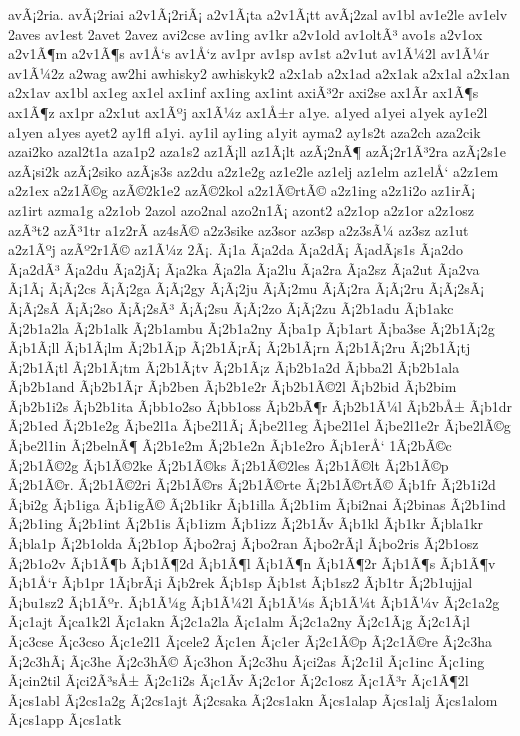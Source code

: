 {avÃ¡2ria.
avÃ¡2riai
a2v1Ã¡2riÃ¡
a2v1Ã¡ta
a2v1Ã¡tt
avÃ¡2zal
av1bl
av1e2le
av1elv
2aves
av1est
2avet
2avez
avi2cse
av1ing
av1kr
a2v1old
av1oltÃ³
avo1s
a2v1ox
a2v1Ã¶m
a2v1Ã¶s
av1Å‘s
av1Å‘z
av1pr
av1sp
av1st
a2v1ut
av1Ã¼2l
av1Ã¼r
av1Ã¼2z
a2wag
aw2hi
awhisky2
awhiskyk2
a2x1ab
a2x1ad
a2x1ak
a2x1al
a2x1an
a2x1av
ax1bl
ax1eg
ax1el
ax1inf
ax1ing
ax1int
axiÃ³2r
axi2se
ax1Ã­r
ax1Ã¶s
ax1Ã¶z
ax1pr
a2x1ut
ax1Ãºj
ax1Ã¼z
ax1Å±r
a1ye.
a1yed
a1yei
a1yek
ay1e2l
a1yen
a1yes
ayet2
ay1fl
a1yi.
ay1il
ay1ing
a1yit
ayma2
ay1s2t
aza2ch
aza2cik
azai2ko
azal2t1a
aza1p2
aza1s2
az1Ã¡ll
az1Ã¡lt
azÃ¡2nÃ¶
azÃ¡2r1Ã³2ra
azÃ¡2s1e
azÃ¡si2k
azÃ¡2siko
azÃ¡s3s
az2du
a2z1e2g
az1e2le
az1elj
az1elm
az1elÅ‘
a2z1em
a2z1ex
a2z1Ã©g
azÃ©2k1e2
azÃ©2kol
a2z1Ã©rtÃ©
a2z1ing
a2z1i2o
az1irÃ¡
az1irt
azma1g
a2z1ob
2azol
azo2nal
azo2n1Ã¡
azont2
a2z1op
a2z1or
a2z1osz
azÃ³t2
azÃ³1tr
a1z2rÃ­
az4sÃ©
a2z3sike
az3sor
az3sp
a2z3sÃ¼
az3sz
az1ut
a2z1Ãºj
azÃº2r1Ã©
az1Ã¼z
2Ã¡.
Ã¡1a
Ã¡a2da
Ã¡a2dÃ¡
Ã¡adÃ¡s1s
Ã¡a2do
Ã¡a2dÃ³
Ã¡a2du
Ã¡a2jÃ¡
Ã¡a2ka
Ã¡a2la
Ã¡a2lu
Ã¡a2ra
Ã¡a2sz
Ã¡a2ut
Ã¡a2va
Ã¡1Ã¡
Ã¡Ã¡2cs
Ã¡Ã¡2ga
Ã¡Ã¡2gy
Ã¡Ã¡2ju
Ã¡Ã¡2mu
Ã¡Ã¡2ra
Ã¡Ã¡2ru
Ã¡Ã¡2sÃ¡
Ã¡Ã¡2sÃ­
Ã¡Ã¡2so
Ã¡Ã¡2sÃ³
Ã¡Ã¡2su
Ã¡Ã¡2zo
Ã¡Ã¡2zu
Ã¡2b1adu
Ã¡b1akc
Ã¡2b1a2la
Ã¡2b1alk
Ã¡2b1ambu
Ã¡2b1a2ny
Ã¡ba1p
Ã¡b1art
Ã¡ba3se
Ã¡2b1Ã¡2g
Ã¡b1Ã¡ll
Ã¡b1Ã¡lm
Ã¡2b1Ã¡p
Ã¡2b1Ã¡rÃ¡
Ã¡2b1Ã¡rn
Ã¡2b1Ã¡2ru
Ã¡2b1Ã¡tj
Ã¡2b1Ã¡tl
Ã¡2b1Ã¡tm
Ã¡2b1Ã¡tv
Ã¡2b1Ã¡z
Ã¡b2b1a2d
Ã¡bba2l
Ã¡b2b1ala
Ã¡b2b1and
Ã¡b2b1Ã¡r
Ã¡b2ben
Ã¡b2b1e2r
Ã¡b2b1Ã©2l
Ã¡b2bid
Ã¡b2bim
Ã¡b2b1i2s
Ã¡b2b1ita
Ã¡bb1o2so
Ã¡bb1oss
Ã¡b2bÃ¶r
Ã¡b2b1Ã¼l
Ã¡b2bÅ±
Ã¡b1dr
Ã¡2b1ed
Ã¡2b1e2g
Ã¡be2l1a
Ã¡be2l1Ã¡
Ã¡be2l1eg
Ã¡be2l1el
Ã¡be2l1e2r
Ã¡be2lÃ©g
Ã¡be2l1in
Ã¡2belnÃ¶
Ã¡2b1e2m
Ã¡2b1e2n
Ã¡b1e2ro
Ã¡b1erÅ‘
1Ã¡2bÃ©c
Ã¡2b1Ã©2g
Ã¡b1Ã©2ke
Ã¡2b1Ã©ks
Ã¡2b1Ã©2les
Ã¡2b1Ã©lt
Ã¡2b1Ã©p
Ã¡2b1Ã©r.
Ã¡2b1Ã©2ri
Ã¡2b1Ã©rs
Ã¡2b1Ã©rte
Ã¡2b1Ã©rtÃ©
Ã¡b1fr
Ã¡2b1i2d
Ã¡bi2g
Ã¡b1iga
Ã¡b1igÃ©
Ã¡2b1ikr
Ã¡b1illa
Ã¡2b1im
Ã¡bi2nai
Ã¡2binas
Ã¡2b1ind
Ã¡2b1ing
Ã¡2b1int
Ã¡2b1is
Ã¡b1izm
Ã¡b1izz
Ã¡2b1Ã­v
Ã¡b1kl
Ã¡b1kr
Ã¡bla1kr
Ã¡bla1p
Ã¡2b1olda
Ã¡2b1op
Ã¡bo2raj
Ã¡bo2ran
Ã¡bo2rÃ¡l
Ã¡bo2ris
Ã¡2b1osz
Ã¡2b1o2v
Ã¡b1Ã¶b
Ã¡b1Ã¶2d
Ã¡b1Ã¶l
Ã¡b1Ã¶n
Ã¡b1Ã¶2r
Ã¡b1Ã¶s
Ã¡b1Ã¶v
Ã¡b1Å‘r
Ã¡b1pr
1Ã¡brÃ¡i
Ã¡b2rek
Ã¡b1sp
Ã¡b1st
Ã¡b1sz2
Ã¡b1tr
Ã¡2b1ujjal
Ã¡bu1sz2
Ã¡b1Ãºr.
Ã¡b1Ã¼g
Ã¡b1Ã¼2l
Ã¡b1Ã¼s
Ã¡b1Ã¼t
Ã¡b1Ã¼v
Ã¡2c1a2g
Ã¡c1ajt
Ã¡ca1k2l
Ã¡c1akn
Ã¡2c1a2la
Ã¡c1alm
Ã¡2c1a2ny
Ã¡2c1Ã¡g
Ã¡2c1Ã¡l
Ã¡c3cse
Ã¡c3cso
Ã¡c1e2l1
Ã¡cele2
Ã¡c1en
Ã¡c1er
Ã¡2c1Ã©p
Ã¡2c1Ã©re
Ã¡2c3ha
Ã¡2c3hÃ¡
Ã¡c3he
Ã¡2c3hÃ©
Ã¡c3hon
Ã¡2c3hu
Ã¡ci2as
Ã¡2c1il
Ã¡c1inc
Ã¡c1ing
Ã¡cin2til
Ã¡ci2Ã³sÅ±
Ã¡2c1i2s
Ã¡c1Ã­v
Ã¡2c1or
Ã¡2c1osz
Ã¡c1Ã³r
Ã¡c1Ã¶2l
Ã¡cs1abl
Ã¡2cs1a2g
Ã¡2cs1ajt
Ã¡2csaka
Ã¡2cs1akn
Ã¡cs1alap
Ã¡cs1alj
Ã¡cs1alom
Ã¡cs1app
Ã¡cs1atk
}
